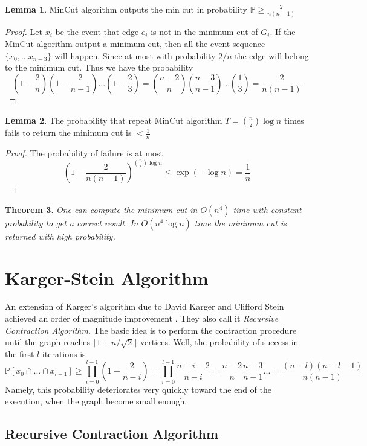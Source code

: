 \documentclass[11pt]{article}
\theoremstyle{plain}
\newtheorem{thm}{Theorem}[section]
\theoremstyle{definition}
\newtheorem{lem}[thm]{Lemma}
\theoremstyle{remark}
\begin{document}
	\begin{lem}
	MinCut algorithm outputs the min cut in probability $ \mathbb{P}\geq \frac{2}{n(n-1)} $
	\end{lem}
	\begin{proof}
	Let $ x_i $ be the event that edge $ e_i $ is not in the minimum cut of $ G_i $. If the MinCut algorithm output a minimum cut, then all the event sequence $ \{ x_0,...x_{n-3} \} $ will happen. Since at most with probability $ 2/n $ the edge will belong to the minimum cut. Thus we have the probability \[ (1-\frac{2}{n})(1-\frac{2}{n-1})...(1-\frac{2}{3})=(\frac{n-2}{n})(\frac{n-3}{n-1})...(\frac{1}{3})=\frac{2}{n(n-1)} \]
	\end{proof}
	
	\begin{lem}
	The probability that repeat MinCut algorithm $ T={n \choose 2}\log n $ times fails to return the minimum cut is $ <\frac{1}{n} $
	\end{lem}
	\begin{proof}
	The probability of failure is at most\[  (1-\frac{2}{n(n-1)} )^{{n \choose 2}\log n} \leq  \exp(-\log n)=\frac{1}{n} \]
	\end{proof}
	
	\begin{thm}
	One can compute the minimum cut in $ O(n^4) $ time with constant probability to get a correct result. In $ O(n^4 \log n) $ time the minimum cut is returned with high probability.
	\end{thm}


\section{Karger-Stein Algorithm}
	
	An extension of Karger's algorithm due to David Karger and Clifford Stein achieved an order of magnitude improvement \cite{karger1996new}. They also call it \textit{Recursive Contraction Algorithm}. 
	The basic idea is to perform the contraction procedure until the graph reaches $ \lceil 1+n/\sqrt{2} \rceil $ vertices. Well, the probability of success in the first $ l $ iterations is \[ \mathbb{P}[x_0\cap ... \cap x_{l-1}]\geq \prod_{i=0}^{l-1}(1-\frac{2}{n-i}) = \prod_{i=0}^{l-1}\frac{n-i-2}{n-i} = \frac{n-2}{n} \frac{n-3}{n-1}...= \frac{(n-l)(n-l-1)}{n(n-1)} \]
	Namely, this probability deteriorates very quickly toward the end of the execution, when the graph become small enough.
	
	\subsection{Recursive Contraction Algorithm}
	
\end{document}
